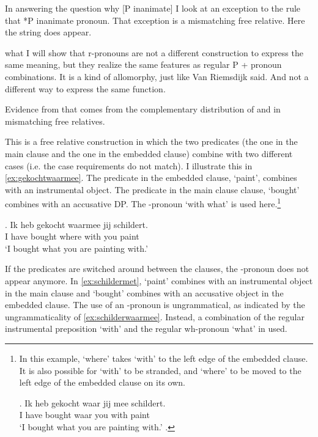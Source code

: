 \documentclass[12pt]{article}
\begin{document}
In answering the question why [P inanimate] I look at an exception to the rule that *P inanimate pronoun. That exception is a mismatching free relative. Here the string  does appear.

what I will show that r-pronouns are not a different construction to express the same meaning, but they realize the same features as regular P + pronoun combinations. It is a kind of allomorphy, just like Van Riemsdijk said. And not a different way to express the same function.

Evidence from that comes from the complementary distribution of  and  in mismatching free relatives.

This is a free relative construction in which the two predicates (the one in the main clause and the one in the embedded clause) combine with two different cases (i.e. the case requirements do not match). I illustrate this in \ref{ex:gekochtwaarmee}. The predicate in the embedded clause,  `paint', combines with an instrumental object. The predicate in the main clause clause,  `bought' combines with an accusative DP. The -pronoun  `with what' is used here.\footnote{In this example,  `where' takes  `with' to the left edge of the embedded clause. It is also possible for  `with' to be stranded, and  `where' to be moved to the left edge of the embedded clause on its own.

\exg. Ik heb gekocht waar jij mee schildert.\\
 I have bought waar you with paint\\
 `I bought what you are painting with.'\label{ex:meealong}
\z.

\phantom{x}
}

\exg. Ik heb gekocht waarmee jij schildert.\\
 I have bought {where with} you paint\\
 `I bought what you are painting with.'\label{ex:gekochtwaarmee}

If the predicates are switched around between the clauses, the -pronoun does not appear anymore. In \ref{ex:schildermet},  `paint' combines with an instrumental object in the main clause and  `bought' combines with an accusative object in the embedded clause. The use of an -pronoun is ungrammatical, as indicated by the ungrammaticality of \ref{ex:schilderwaarmee}. Instead, a combination of the regular instrumental preposition  `with' and the regular wh-pronoun  `what' in used.
\end{document}
